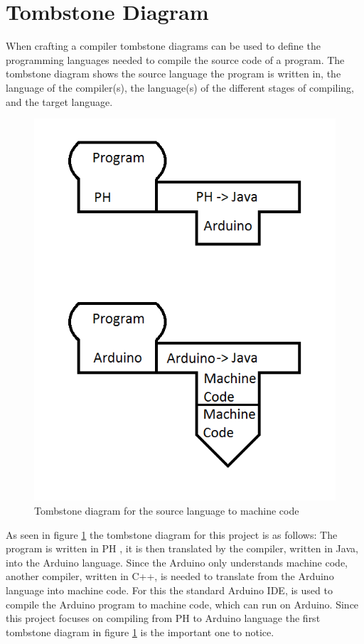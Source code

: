 \section{Tombstone Diagram}
When crafting a compiler tombstone diagrams can be used to define the programming languages needed to compile the source code of a program. The tombstone diagram shows the source language the program is written in, the language of the compiler(s), the language(s) of the different stages of compiling, and the target language.

\begin{figure}[H]
	\centering
		\includegraphics{billeder/tombstone_diagram.png}
		\caption{Tombstone diagram for the source language to machine code}
		\label{fig:tombstone}
\end{figure}

As seen in figure \ref{fig:tombstone} the tombstone diagram for this project is as follows: The program is written in PH , it is then translated by the compiler, written in Java, into the Arduino language. Since the Arduino only understands machine code, another compiler, written in C++, is needed to translate from the Arduino language into machine code. For this the standard Arduino IDE, is used to compile the Arduino program to machine code, which can run on Arduino.
Since this project focuses on compiling from PH to Arduino language the first tombstone diagram in figure \ref{fig:tombstone} is the important one to notice.